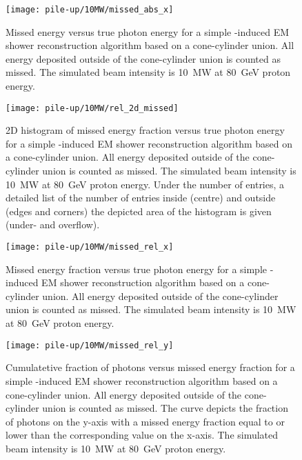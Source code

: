 \begin{figure}[htb]
	\centering
	\texttt{[image: pile-up/10MW/missed\_abs\_x]}
	\caption{Missed energy versus true photon energy for a simple \Pgpz-induced EM shower reconstruction algorithm based on a cone-cylinder union.
		All energy deposited outside of the cone-cylinder union is counted as missed.
		The simulated beam intensity is \SI{10}{\mega\watt} at \SI{80}{\giga\electronvolt} proton energy.}
\end{figure}

\begin{figure}[htb]
	\centering
	\texttt{[image: pile-up/10MW/rel\_2d\_missed]}
	\caption{2D histogram of missed energy fraction versus true photon energy for a simple \Pgpz-induced EM shower reconstruction algorithm based on a cone-cylinder union.
		All energy deposited outside of the cone-cylinder union is counted as missed.
		The simulated beam intensity is \SI{10}{\mega\watt} at \SI{80}{\giga\electronvolt} proton energy.
		Under the number of entries, a detailed list of the number of entries inside (centre) and outside (edges and corners) the depicted area of the histogram is given (under- and overflow).}
\end{figure}

\begin{figure}[htb]
	\centering
	\texttt{[image: pile-up/10MW/missed\_rel\_x]}
	\caption{Missed energy fraction versus true photon energy for a simple \Pgpz-induced EM shower reconstruction algorithm based on a cone-cylinder union.
		All energy deposited outside of the cone-cylinder union is counted as missed.
		The simulated beam intensity is \SI{10}{\mega\watt} at \SI{80}{\giga\electronvolt} proton energy.}
\end{figure}

\begin{figure}[htb]
	\centering
	\texttt{[image: pile-up/10MW/missed\_rel\_y]}
	\caption{Cumulatetive fraction of photons versus missed energy fraction for a simple \Pgpz-induced EM shower reconstruction algorithm based on a cone-cylinder union.
		All energy deposited outside of the cone-cylinder union is counted as missed.
		The curve depicts the fraction of photons on the y-axis with a missed energy fraction equal to or lower than the corresponding value on the x-axis.
		The simulated beam intensity is \SI{10}{\mega\watt} at \SI{80}{\giga\electronvolt} proton energy.}
\end{figure}

